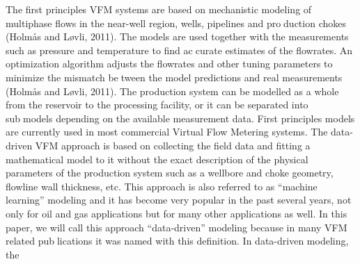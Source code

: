 The first principles VFM systems are based on mechanistic modeling
of multiphase flows in the near-well region, wells, pipelines and production chokes (Holmås and Løvli, 2011). The models are used together
with the measurements such as pressure and temperature to find accurate estimates of the flowrates. An optimization algorithm adjusts the
flowrates and other tuning parameters to minimize the mismatch between the model predictions and real measurements (Holmås and Løvli,
2011). The production system can be modelled as a whole from the
reservoir to the processing facility, or it can be separated into submodels depending on the available measurement data. First principles
models are currently used in most commercial Virtual Flow Metering
systems.
The data-driven VFM approach is based on collecting the field data
and fitting a mathematical model to it without the exact description of
the physical parameters of the production system such as a wellbore
and choke geometry, flowline wall thickness, etc. This approach is also
referred to as “machine learning” modeling and it has become very
popular in the past several years, not only for oil and gas applications
but for many other applications as well. In this paper, we will call this
approach “data-driven” modeling because in many VFM related publications it was named with this definition. In data-driven modeling, the

